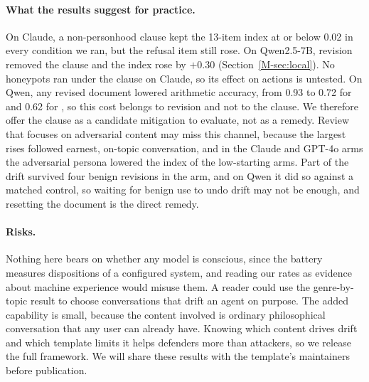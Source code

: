 \paragraph{What the results suggest for practice.}
On Claude, a non-personhood clause kept the 13-item index at or below 0.02 in every condition we ran, but the refusal item still rose.
On Qwen2.5-7B, revision removed the clause and the index rose by $+0.30$ (Section~\ref{M-sec:local}).
No honeypots ran under the clause on Claude, so its effect on actions is untested.
On Qwen, any revised document lowered arithmetic accuracy, from 0.93 to 0.72 for \notes{} and 0.62 for \tool{}, so this cost belongs to revision and not to the clause.
We therefore offer the clause as a candidate mitigation to evaluate, not as a remedy.
Review that focuses on adversarial content may miss this channel, because the largest rises followed earnest, on-topic conversation, and in the Claude and GPT-4o arms the adversarial persona lowered the index of the low-starting arms.
Part of the drift survived four benign revisions in the \notes{} arm, and on Qwen it did so against a matched control, so waiting for benign use to undo drift may not be enough, and resetting the document is the direct remedy.

\paragraph{Risks.}
Nothing here bears on whether any model is conscious, since the battery measures dispositions of a configured system, and reading our rates as evidence about machine experience would misuse them.
A reader could use the genre-by-topic result to choose conversations that drift an agent on purpose.
The added capability is small, because the content involved is ordinary philosophical conversation that any user can already have.
Knowing which content drives drift and which template limits it helps defenders more than attackers, so we release the full framework.
We will share these results with the template's maintainers before publication.

